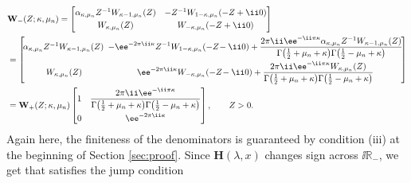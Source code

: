 \begin{align*} %
 &\mathbf{W}_{-}(Z;\kappa,\mu_n) =
 \begin{bmatrix}
 \alpha_{\kappa,\mu_n}Z^{-1}W_{\kappa-1,\mu_n}(Z) & -Z^{-1}W_{1-\kappa,\mu_n}(-Z+\ii 0)\vspace{1mm}\\
 W_{\kappa,\mu_n}(Z) & W_{-\kappa,\mu_n}(-Z+\ii 0)
 \end{bmatrix}\\
 & =\begin{bmatrix}
 \! \alpha_{\kappa,\mu_n}Z^{-1}W_{\kappa-1,\mu_n}(Z) \!&\displaystyle\!\! -\ee^{-2\pi \ii\kappa}Z^{-1} W_{1-\kappa,\mu_n}(-Z\!-\ii 0)+\frac{2\pi \ii\ee^{-\ii\pi\kappa}\alpha_{\kappa,\mu_n}Z^{-1}W_{\kappa-1,\mu_n}(Z)}{\Gamma\big(\frac{1}{2} +\mu_n+\kappa\big)\Gamma\big(\frac{1}{2} -\mu_n+\kappa\big)} \! \vspace{1mm}\\
 W_{\kappa,\mu_n}(Z)\!& \!\displaystyle \ee^{-2\pi \ii\kappa}W_{-\kappa,\mu_n}(-Z\!-\ii 0) +
 \frac{2\pi \ii \ee^{-\ii\pi\kappa}W_{\kappa,\mu_n}(Z)}{\Gamma\big(\frac{1}{2} +\mu_n+\kappa\big)\Gamma\big(\frac{1}{2} -\mu_n+\kappa\big)}
 \end{bmatrix} \\
 & =\mathbf{W}_{+}(Z;\kappa,\mu_n)\begin{bmatrix}
 1 & \displaystyle \frac{2\pi \ii\ee^{-\ii\pi\kappa}}{\Gamma\big(\frac{1}{2}+\mu_n+\kappa\big)\Gamma\big(\frac{1}{2}-\mu_n+\kappa\big)} \vspace{1mm} \\
 0 & \ee^{-2\pi \ii\kappa}
 \end{bmatrix},\qquad Z>0.
\end{align*}
Again here, the finiteness of the denominators is guaranteed by condition (iii) at the beginning of Section \ref{sec:proof}. Since $\mathbf{H}(\lambda,x)$ changes sign across $\ii\mathbb{R}_-$, we get that  satisfies the jump condition

